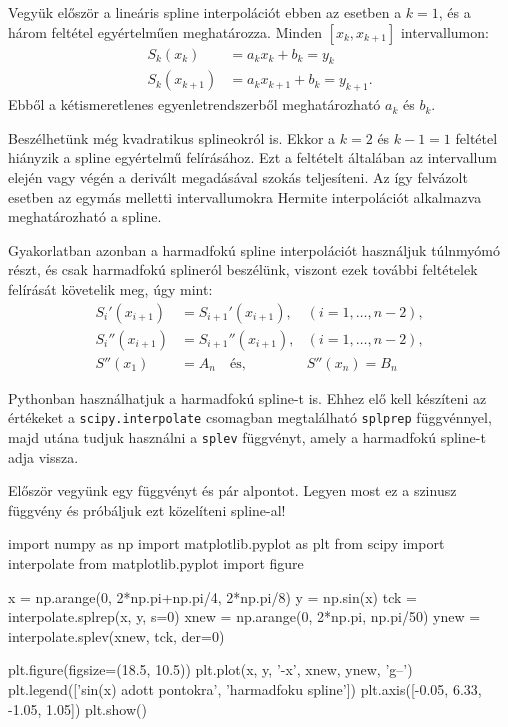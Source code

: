     Vegyük először a lineáris spline interpolációt ebben az esetben a
\(k=1\), és a három feltétel egyértelműen meghatározza. Minden
\([x_k, x_{k+1}]\) intervallumon:
\begin{align*}
S_k(x_k) &= a_kx_k+b_k=y_k \\
S_k(x_{k+1}) &= a_kx_{k+1}+b_k=y_{k+1}.
\end{align*}
Ebből a kétismeretlenes egyenletrendszerből meghatározható \(a_k\) és
\(b_k\).

    Beszélhetünk még kvadratikus splineokról is. Ekkor a \(k=2\) és
\(k-1 = 1\) feltétel hiányzik a spline egyértelmű felírásához. Ezt a
feltételt általában az intervallum elején vagy végén a derivált
megadásával szokás teljesíteni. Az így felvázolt esetben az egymás
melletti intervallumokra Hermite interpolációt alkalmazva meghatározható
a spline.

    Gyakorlatban azonban a harmadfokú spline interpolációt használjuk
túlnmyómó részt, és csak harmadfokú splineról beszélünk, viszont ezek
további feltételek felírását követelik meg, úgy mint:
\begin{align*}
S_i'(x_{i+1}) &= S_{i+1}'(x_{i+1}), &(i=1, \dots, n-2),\\
S_i''(x_{i+1}) &= S_{i+1}''(x_{i+1}), &(i=1, \dots, n-2),\\
S''(x_{1}) &= A_n \quad \textrm{és}, &S''(x_{n}) = B_n
\end{align*}

    Pythonban használhatjuk a harmadfokú spline-t is. Ehhez elő kell készíteni az értékeket
a \texttt{scipy.interpolate} csomagban megtalálható \texttt{splprep} függvénnyel,
majd utána tudjuk használni a \texttt{splev} függvényt, amely a harmadfokú
spline-t adja vissza.

    Először vegyünk egy függvényt és pár alpontot. Legyen most ez a szinusz
függvény és próbáljuk ezt közelíteni spline-al!
\begin{python}
import numpy as np
import matplotlib.pyplot as plt
from scipy import interpolate
from matplotlib.pyplot import figure


x = np.arange(0, 2*np.pi+np.pi/4, 2*np.pi/8)
y = np.sin(x)
tck = interpolate.splrep(x, y, s=0)
xnew = np.arange(0, 2*np.pi, np.pi/50)
ynew = interpolate.splev(xnew, tck, der=0)

plt.figure(figsize=(18.5, 10.5))
plt.plot(x, y, '-x', xnew, ynew, 'g--')
plt.legend(['sin(x) adott pontokra', 'harmadfoku spline'])
plt.axis([-0.05, 6.33, -1.05, 1.05])
plt.show()
\end{python}

